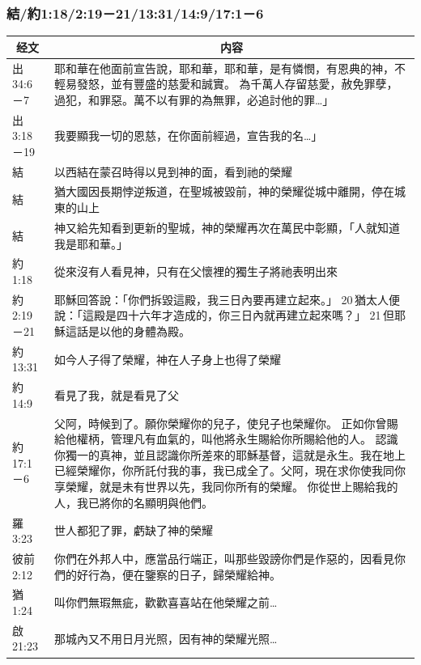 \subsubsection{結/約1:18/2:19－21/13:31/14:9/17:1－6}
\begin{table}[H]
\centering
\begin{tabular}{p{}|p{15.50cm}}\hline\hline
\multicolumn{1}{c|}{经文}&\multicolumn{1}{c}{内容}\\\hline
出34:6－7&耶和華在他面前宣告說，耶和華，耶和華，是有憐憫，有恩典的神，不輕易發怒，並有豐盛的慈愛和誠實。  為千萬人存留慈愛，赦免罪孽，過犯，和罪惡。萬不以有罪的為無罪，必追討他的罪…」\\\hline
出3:18－19&我要顯我一切的恩慈，在你面前經過，宣告我的名…」\\\hline

結&以西結在蒙召時得以見到神的面，看到祂的榮耀\\\hline
結&猶大國因長期悖逆叛道，在聖城被毀前，神的榮耀從城中離開，停在城東的山上\\\hline
結&神又給先知看到更新的聖城，神的榮耀再次在萬民中彰顯，「人就知道我是耶和華。」\\\hline
約1:18&從來沒有人看見神，只有在父懷裡的獨生子將祂表明出來\\\hline
約2:19－21&耶穌回答說：「你們拆毀這殿，我三日內要再建立起來。」 20 猶太人便說：「這殿是四十六年才造成的，你三日內就再建立起來嗎？」 21 但耶穌這話是以他的身體為殿。\\\hline
約13:31&如今人子得了榮耀，神在人子身上也得了榮耀\\\hline
約14:9&看見了我，就是看見了父\\\hline
約17:1－6&父阿，時候到了。願你榮耀你的兒子，使兒子也榮耀你。  正如你曾賜給他權柄，管理凡有血氣的，叫他將永生賜給你所賜給他的人。  認識你獨一的真神，並且認識你所差來的耶穌基督，這就是永生。我在地上已經榮耀你，你所託付我的事，我已成全了。父阿，現在求你使我同你享榮耀，就是未有世界以先，我同你所有的榮耀。  你從世上賜給我的人，我已將你的名顯明與他們。\\\hline
羅3:23&世人都犯了罪，虧缺了神的榮耀\\\hline
彼前2:12&你們在外邦人中，應當品行端正，叫那些毀謗你們是作惡的，因看見你們的好行為，便在鑒察的日子，歸榮耀給神。\\\hline
猶1:24&叫你們無瑕無疵，歡歡喜喜站在他榮耀之前…\\\hline
啟21:23&那城內又不用日月光照，因有神的榮耀光照…\\\hline

\end{tabular}
\end{table}



































